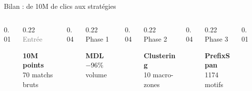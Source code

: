 \documentclass[aspectratio=169, 11pt]{beamer}
\begin{document}
\begin{frame}{Bilan : de 10M de clics aux stratégies}
\small

\centering
\vspace{0.1cm}

\begin{columns}[c]
\begin{column}{0.01\textwidth}\end{column}
\begin{column}{0.22\textwidth}
    \centering
    {\footnotesize\textcolor{gray}{Entrée}}\\[0.1cm]
    \colorbox{dota_dark!80}{\parbox{0.9\linewidth}{\centering\color{white}\textbf{10M points}\\[0.05cm]{\scriptsize 70 matchs bruts}}}
\end{column}
\begin{column}{0.04\textwidth}
    \centering{\textcolor{gray}{$\Rightarrow$}}
\end{column}
\begin{column}{0.22\textwidth}
    \centering
    {\footnotesize\textcolor{dota_blue}{Phase 1}}\\[0.1cm]
    \colorbox{dota_blue}{\parbox{0.9\linewidth}{\centering\color{white}\textbf{MDL}\\[0.05cm]{\scriptsize $-$96\% volume}}}
\end{column}
\begin{column}{0.04\textwidth}
    \centering{\textcolor{gray}{$\Rightarrow$}}
\end{column}
\begin{column}{0.22\textwidth}
    \centering
    {\footnotesize\textcolor{dota_accent}{Phase 2}}\\[0.1cm]
    \colorbox{dota_accent}{\parbox{0.9\linewidth}{\centering\color{white}\textbf{Clustering}\\[0.05cm]{\scriptsize 10 macro-zones}}}
\end{column}
\begin{column}{0.04\textwidth}
    \centering{\textcolor{gray}{$\Rightarrow$}}
\end{column}
\begin{column}{0.22\textwidth}
    \centering
    {\footnotesize\textcolor{dota_green!70!black}{Phase 3}}\\[0.1cm]
    \colorbox{dota_green!70!black}{\parbox{0.9\linewidth}{\centering\color{white}\textbf{PrefixSpan}\\[0.05cm]{\scriptsize 1174 motifs}}}
\end{column}
\begin{column}{0.01\textwidth}\end{column}
\end{columns}


\end{frame}
\end{document}
